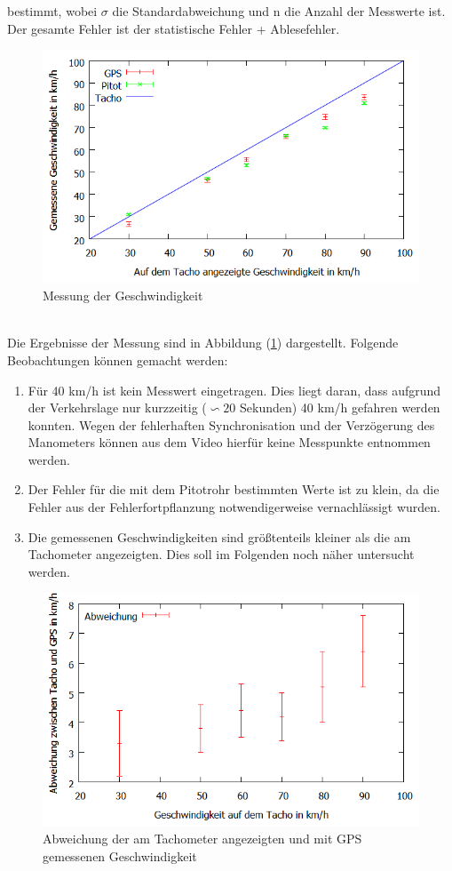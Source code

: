 bestimmt, wobei $\sigma$ die Standardabweichung und n die Anzahl der Messwerte ist. Der gesamte Fehler ist der statistische Fehler + Ablesefehler.
\\
\begin{figure}
      \includegraphics[width=.9\textwidth]{images/Geschwindigkeit}
\caption{Messung der Geschwindigkeit}
\label{fig:Geschwindigkeit}
\end{figure}
\\
Die Ergebnisse der Messung sind in Abbildung (\ref{fig:Geschwindigkeit}) dargestellt. Folgende Beobachtungen können gemacht werden:
\begin{enumerate}
\item Für 40 km/h ist kein Messwert eingetragen. Dies liegt daran, dass aufgrund der Verkehrslage nur kurzzeitig ($\backsim 20$ Sekunden) 40 km/h gefahren werden konnten. Wegen der fehlerhaften Synchronisation und der Verzögerung des Manometers können aus dem Video hierfür keine Messpunkte entnommen werden.
\item Der Fehler für die mit dem Pitotrohr bestimmten Werte ist zu klein, da die Fehler aus der Fehlerfortpflanzung notwendigerweise vernachlässigt wurden.
\item Die gemessenen Geschwindigkeiten sind größtenteils kleiner als die am Tachometer angezeigten. Dies soll im Folgenden noch näher untersucht werden.
\end{enumerate}
\begin{figure}
      \includegraphics[width=.9\textwidth]{images/AbweichungGPSTacho}
\caption{Abweichung der am Tachometer angezeigten und mit GPS gemessenen Geschwindigkeit}
\label{fig:AbweichungGPSTacho}
\end{figure}
